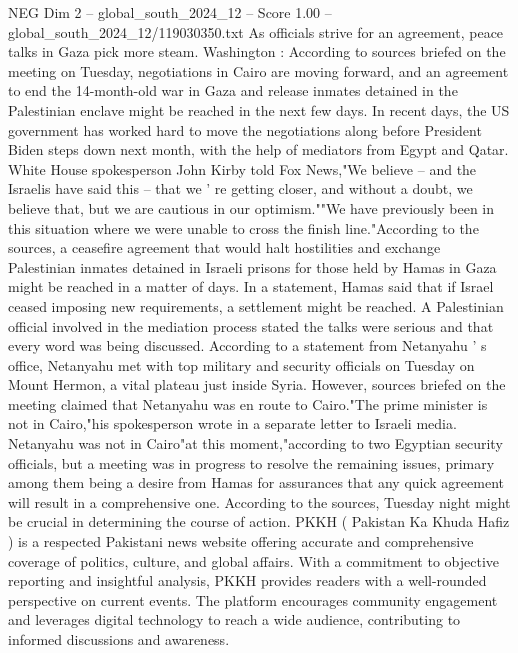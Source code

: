 \begin{textsample}{NEG Dim 2 – global\_south\_2024\_12 – Score 1.00 – global\_south\_2024\_12/119030350.txt}  \label{ex:f2_neg_240}
As officials strive for an agreement, peace talks in Gaza pick more steam.
Washington : According to sources briefed on the meeting on Tuesday, negotiations in Cairo are moving forward, and an agreement to end the 14-month-old war in Gaza and release inmates detained in the Palestinian enclave might be reached in the next few days.
In recent days, the US government has worked hard to move the negotiations along before President Biden steps down next month, with the help of mediators from Egypt and Qatar.
White House spokesperson John Kirby told Fox News,"We believe -- and the Israelis have said this -- that we ' re getting closer, and without a doubt, we believe that, but we are cautious in our optimism.""We have previously been in this situation where we were unable to cross the finish line."According to the sources, a ceasefire agreement that would halt hostilities and exchange Palestinian inmates detained in Israeli prisons for those held by Hamas in Gaza might be reached in a matter of days.
In a statement, Hamas said that if Israel ceased imposing new requirements, a settlement might be reached.
A Palestinian official involved in the mediation process stated the talks were serious and that every word was being discussed.
According to a statement from Netanyahu ' s office, Netanyahu met with top military and security officials on Tuesday on Mount Hermon, a vital plateau just inside Syria.
However, sources briefed on the meeting claimed that Netanyahu was en route to Cairo."The prime minister is not in Cairo,"his spokesperson wrote in a separate letter to Israeli media.
Netanyahu was not in Cairo"at this moment,"according to two Egyptian security officials, but a meeting was in progress to resolve the remaining issues, primary among them being a desire from Hamas for assurances that any quick agreement will result in a comprehensive one.
According to the sources, Tuesday night might be crucial in determining the course of action.
PKKH ( Pakistan Ka Khuda Hafiz ) is a respected Pakistani news website offering accurate and comprehensive coverage of politics, culture, and global affairs.
With a commitment to objective reporting and insightful analysis, PKKH provides readers with a well-rounded perspective on current events.
The platform encourages community engagement and leverages digital technology to reach a wide audience, contributing to informed discussions and awareness.

\end{textsample}
